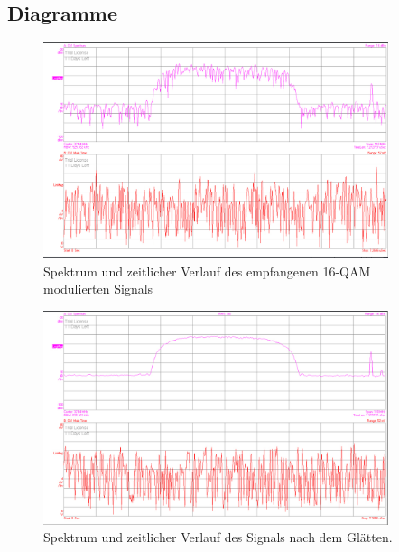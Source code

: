 \documentclass[12pt,a4paper,ngerman]{article}
\begin{document}
\subsection{Diagramme}
\begin{figure}[H]
\centering
\includegraphics[width=0.9\textwidth]{figures/Aufgabe2_16QAM_1.jpg} 
\caption{Spektrum und zeitlicher Verlauf des empfangenen 16-QAM modulierten Signals}\label{fig:aufg2_16QAM_spec}
\end{figure}

\begin{figure}[H]
\centering
\includegraphics[width=0.9\textwidth]{figures/Aufgabe2_16QAM_avg.jpg} 
\caption{Spektrum und zeitlicher Verlauf des Signals nach dem Glätten.}\label{fig:aufg2_16QAM_spec_avg}
\end{figure}
\end{document}

